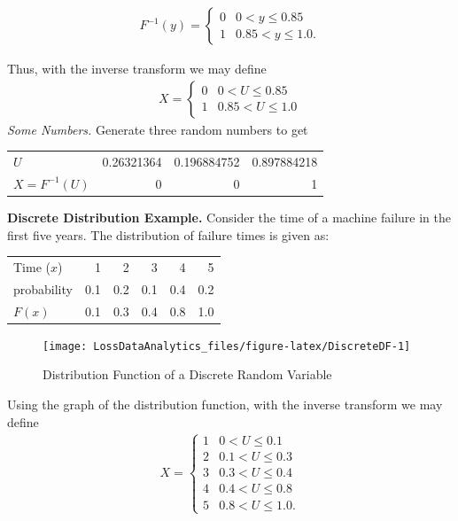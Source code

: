 \documentclass[]{book}
\theoremstyle{definition}
\theoremstyle{definition}
\theoremstyle{definition}
\theoremstyle{remark}
\begin{document}
\[\begin{aligned}
F^{-1}(y) = \left\{ \begin{array}{cc}
              0 & 0<y \leq 0.85 \\
              1 & 0.85 < y  \leq  1.0 .
            \end{array} \right.\end{aligned}\]

Thus, with the inverse transform we may define \[\begin{aligned}
X = \left\{ \begin{array}{cc}
              0 & 0<U \leq 0.85  \\
              1 &  0.85 < U  \leq  1.0
            \end{array} \right.\end{aligned}\] \emph{Some Numbers.}
Generate three random numbers to get

\begin{longtable}[]{@{}lrrr@{}}
\toprule
\(U\) & 0.26321364 & 0.196884752 & 0.897884218\tabularnewline
\(X =F^{-1}(U)\) & 0 & 0 & 1\tabularnewline
\bottomrule
\end{longtable}

\textbf{Discrete Distribution Example.} Consider the time of a machine
failure in the first five years. The distribution of failure times is
given as:

\begin{longtable}[]{@{}lrrrrr@{}}
\toprule
Time (\(x\)) & 1 & 2 & 3 & 4 & 5\tabularnewline
probability & 0.1 & 0.2 & 0.1 & 0.4 & 0.2\tabularnewline
\(F(x)\) & 0.1 & 0.3 & 0.4 & 0.8 & 1.0\tabularnewline
\bottomrule
\end{longtable}

\begin{figure}

{\centering \texttt{[image: LossDataAnalytics\_files/figure-latex/DiscreteDF-1]} 

}

\caption{Distribution Function of a Discrete Random Variable}\label{fig:DiscreteDF}
\end{figure}

Using the graph of the distribution function, with the inverse transform
we may define \[\begin{aligned}
X = \left\{ \begin{array}{cc}
              1 &   0<U  \leq 0.1  \\
              2 &  0.1 < U  \leq  0.3\\
              3 &  0.3 < U  \leq  0.4\\
              4 &  0.4 < U  \leq  0.8  \\
              5 &  0.8 < U  \leq  1.0     .
            \end{array} \right.\end{aligned}\]
\end{document}
